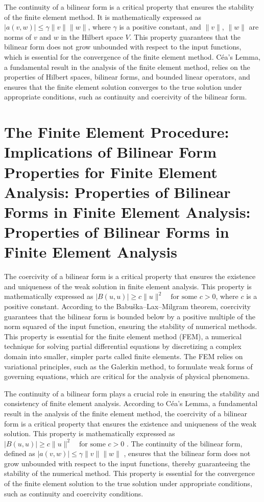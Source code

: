 \documentclass[12pt, a4paper]{article}
\begin{document}
The continuity of a bilinear form is a critical property that ensures the stability of the finite element method. It is mathematically expressed as \(|a(v, w)| \leq \gamma \|v\| \|w\|\), where \(\gamma\) is a positive constant, and \(\|v\|\), \(\|w\|\) are norms of \(v\) and \(w\) in the Hilbert space \(V\). This property guarantees that the bilinear form does not grow unbounded with respect to the input functions, which is essential for the convergence of the finite element method. Céa's Lemma, a fundamental result in the analysis of the finite element method, relies on the properties of Hilbert spaces, bilinear forms, and bounded linear operators, and ensures that the finite element solution converges to the true solution under appropriate conditions, such as continuity and coercivity of the bilinear form.

\section{The Finite Element Procedure: Implications of Bilinear Form Properties for Finite Element Analysis: Properties of Bilinear Forms in Finite Element Analysis: Properties of Bilinear Forms in Finite Element Analysis}
\label{sec:68eb34dc-7184-41c6-b8e0-d93b5c39d8f3}

The coercivity of a bilinear form is a critical property that ensures the existence and uniqueness of the weak solution in finite element analysis. This property is mathematically expressed as \(|B(u, u)| \geq c\|u\|^2 \quad \text{for some } c > 0\), where \(c\) is a positive constant. According to the Babuška–Lax–Milgram theorem, coercivity guarantees that the bilinear form is bounded below by a positive multiple of the norm squared of the input function, ensuring the stability of numerical methods. This property is essential for the finite element method (FEM), a numerical technique for solving partial differential equations by discretizing a complex domain into smaller, simpler parts called finite elements. The FEM relies on variational principles, such as the Galerkin method, to formulate weak forms of governing equations, which are critical for the analysis of physical phenomena.

The continuity of a bilinear form plays a crucial role in ensuring the stability and consistency of finite element analysis. According to Céa's Lemma, a fundamental result in the analysis of the finite element method, the coercivity of a bilinear form is a critical property that ensures the existence and uniqueness of the weak solution. This property is mathematically expressed as \(|B(u, u)| \geq c\|u\|^2 \quad \text{for some } c > 0\) \cite{src:wiki_babu_ka_lax_milgram_theorem-a334b87f26cc}. The continuity of the bilinear form, defined as \(|a(v, w)| \leq \gamma \|v\| \|w\|\) \cite{src:wiki_c_a_s_lemma-c997aed28ad6}, ensures that the bilinear form does not grow unbounded with respect to the input functions, thereby guaranteeing the stability of the numerical method. This property is essential for the convergence of the finite element solution to the true solution under appropriate conditions, such as continuity and coercivity conditions.
\end{document}
